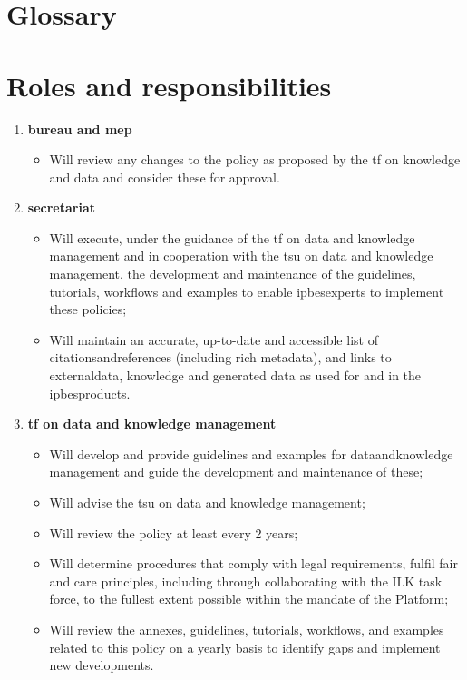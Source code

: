 \documentclass{article}
\begin{document}
\section{Glossary}
\label{sec:glossary}

\printglossary

\section{Roles and responsibilities}
\label{sec:app_roles}

\begin{enumerate}[label=(\alph*)]
    \item \textbf{\gls{bureau} and \gls{mep}}
    \begin{itemize}
        \item Will review any changes to the policy as proposed by the \gls{tf} on knowledge and data and consider these for approval.
    \end{itemize}

    \item \textbf{\gls{secretariat}}
    \begin{itemize}
        \item Will execute, under the guidance of the \gls{tf} on data and knowledge management and in cooperation with the  \gls{tsu} on data and knowledge management, the development and maintenance of the guidelines, tutorials, \glspl{workflow} and examples to enable \glspl{ipbesexpert} to implement these policies;
        \item Will maintain an accurate, up-to-date and \gls{accessible} list of \gls{citationsandreferences} (including rich metadata), and links to \gls{externaldata}, \gls{knowledge} and generated \gls{data} as used for and in the \glspl{ipbesproduct}.
    \end{itemize}

    \item \textbf{\gls{tf} on data and knowledge management}
    \begin{itemize}
        \item Will develop and provide guidelines and examples for \gls{dataandknowledge} management and guide the development and maintenance of these;
        \item Will advise the \gls{tsu} on data and knowledge management;
        \item Will review the policy at least every 2 years;
        \item Will determine procedures that comply with legal requirements, fulfil \gls{fair} and \gls{care} principles, including through collaborating with the ILK task force, to the fullest extent possible within the mandate of the Platform;
        \item Will review the annexes, guidelines, tutorials, \glspl{workflow}, and examples related to this policy on a yearly basis to identify gaps and implement new developments.
    \end{itemize}


\end{enumerate}
\end{document}
